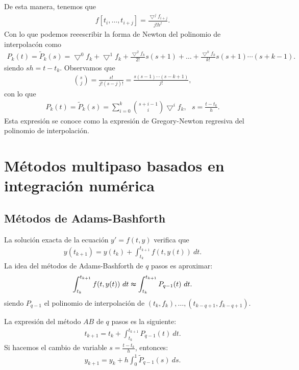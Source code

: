 \begin{obs}
    De esta manera, tenemos que
    \begin{align*}
        f[t_i,\ldots,t_{i+j}] = \frac{\bigtriangledown^j f_{i+j}}{j! h^j}.
    \end{align*}
    Con lo que podemos reeescribir la forma de Newton del polinomio de interpolacón como
    \begin{align*}
        P_k(t) = \widetilde{P}_k(s) = \bigtriangledown^0 f_k + \bigtriangledown^1 f_k + \frac{\bigtriangledown^2 f_k}{2!}s(s+1) + \ldots + \frac{\bigtriangledown^k f_k}{k!}s(s+1)\cdots (s+k-1).
    \end{align*}
    siendo $sh = t - t_k$. Observamos que
    \begin{align*}
        \binom{s}{j} = \frac{s!}{j!(s-j)!} = \frac{s(s-1) \cdots (s-k+1)}{j!},
    \end{align*}
    con lo que
    \begin{align*}
        \boxed{
            P_k(t) = \widetilde{P}_k(s) = \sum_{i=0}^{k} \binom{s+i-1}{i} \bigtriangledown^i f_k, \ \ \ s = \frac{t - t_k}{h}.
        }
    \end{align*}
    Esta expresión se conoce como la expresión de Gregory-Newton regresiva del polinomio de interpolación.
\end{obs}

\section{Métodos multipaso basados en integración numérica}

\subsection{Métodos de Adams-Bashforth}

La solución exacta de la ecuación $y' = f(t,y)$ verifica que
\begin{align*}
    y(t_{k+1}) = y(t_k) + \int_{t_k}^{t_{k+1}} f(t,y(t)) \ dt.
\end{align*}
La idea del métodos de Adams-Bashforth de $q$ pasos es aproximar:
\begin{align*}
    \int_{t_k}^{t_{k+1}} f(t,y(t)) \ dt \thickapprox \int_{t_k}^{t_{k+1}} P_{q-1}(t) \ dt.
\end{align*}
siendo $P_{q-1}$ el polinomio de interpolación de $(t_k,f_k),\ldots,(t_{k-q+1},f_{k-q+1})$.

La expresión del método $AB$ de $q$ pasos es la siguiente:
\begin{align*}
    t_{k+1} = t_k + \int_{t_k}^{t_{k+1}} P_{q-1}(t) \ dt.
\end{align*}
Si hacemos el cambio de variable $s = \frac{t - t_k}{h}$, entonces:
\begin{align*}
    \boxed{
        y_{k+1} = y_k + h \int_{0}^{1} \widetilde{P}_{q-1}(s) \ ds.
    }
\end{align*}

